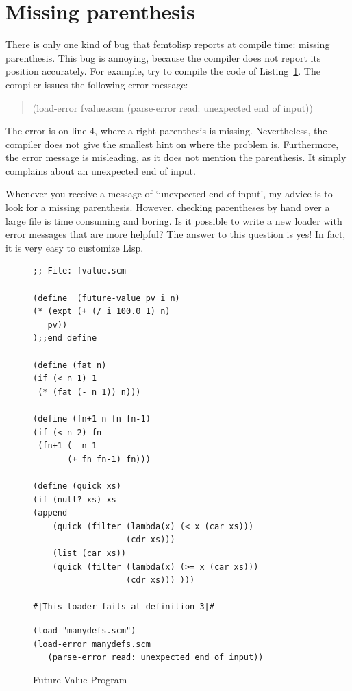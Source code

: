 \documentclass[a4paper,12pt]{book}
\newenvironment{fmpage}[1]
           {\begin{lrbox}{\fmbox}\begin{minipage}{#1}}
           {\end{minipage}\end{lrbox}\fbox{\usebox{\fmbox}}}
\begin{document}
\section{Missing parenthesis}
There is only one kind of bug that femtolisp
reports at compile
time: missing parenthesis.
This bug  is annoying, because the compiler
does not  report its position accurately.
For example, try to compile the code of Listing~\ref{missing-semiColon}.
The compiler issues the
following error message:
\begin{quote}
(load-error fvalue.scm (parse-error read: unexpected end of input))
\end{quote}
The error is on line 4, where a right parenthesis is missing.
Nevertheless, the compiler does not give the smallest
hint on where the problem is. Furthermore, the
error message is misleading,
as it does not mention the parenthesis.
It simply complains about an unexpected end of input.

Whenever you receive a message
of `unexpected end of input', my advice is to
look for a missing parenthesis.
However, checking parentheses by hand over a large file is
time consuming and boring. Is it possible
to write a new loader with error messages
that are more helpful? The answer to this
question is yes! In fact, it is very easy
to customize Lisp.

\begin{figure}[!h]
\begin{fmpage}{0.8\textwidth}
\begin{verbatim}
;; File: fvalue.scm

(define  (future-value pv i n)
(* (expt (+ (/ i 100.0 1) n) 
   pv))
);;end define

(define (fat n)
(if (< n 1) 1
 (* (fat (- n 1)) n)))

(define (fn+1 n fn fn-1)
(if (< n 2) fn
 (fn+1 (- n 1
       (+ fn fn-1) fn)))

(define (quick xs)
(if (null? xs) xs
(append
    (quick (filter (lambda(x) (< x (car xs)))
                   (cdr xs)))
    (list (car xs))
    (quick (filter (lambda(x) (>= x (car xs)))
                   (cdr xs))) )))

#|This loader fails at definition 3|#
\end{verbatim}
\end{fmpage}

\begin{fmpage}{0.8\textwidth}
\verb|(load "manydefs.scm")|\\
\verb|(load-error manydefs.scm |\\
\verb|   (parse-error read: unexpected end of input))|\\
\end{fmpage}
\caption{Future Value Program}
\label{missing-semiColon}
\end{figure}
\end{document}
